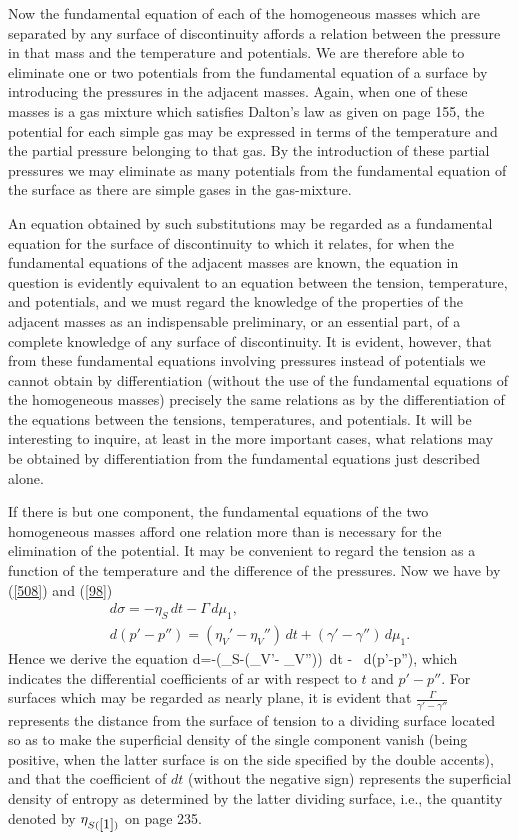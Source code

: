 \documentclass[12pt]{article}
\begin{document}
{Now the fundamental equation of each of the homogeneous masses which are separated by any surface of discontinuity affords a relation between the pressure in that mass and the temperature and potentials. We are therefore able to eliminate one or two potentials from the fundamental equation of a surface by introducing the pressures in the adjacent masses. Again, when one of these masses is a gas mixture which satisfies Dalton's law as given on page 155, the potential for each simple gas may be expressed in terms of the temperature and the partial pressure belonging to that gas. By the introduction of these partial pressures we may eliminate as many potentials from the fundamental equation of the surface as there are simple gases in the gas-mixture.

An equation obtained by such substitutions may be regarded as a fundamental equation for the surface of discontinuity to which it relates, for when the fundamental equations of the adjacent masses are known, the equation in question is evidently equivalent to an equation between the tension, temperature, and potentials, and we must regard the knowledge of the properties of the adjacent masses as an indispensable preliminary, or an essential part, of a complete knowledge of any surface of discontinuity. It is evident, however, that from these fundamental equations involving pressures instead of potentials we cannot obtain by differentiation (without the use of the fundamental equations of the homogeneous masses) precisely the same relations as by the differentiation of the equations between the tensions, temperatures, and potentials.  It will be interesting to inquire, at least in the more important cases, what relations may be obtained by differentiation from  the fundamental equations just described alone.

If there is but one component, the fundamental equations of the two homogeneous masses afford one relation more than is necessary for the elimination of the potential. It may be convenient to regard the tension as a function of the temperature and the difference of the pressures. Now we have by (\ref{508}) and (\ref{98})
\begin{gather*}d\sigma = - \eta_S \, dt- \Gamma\, d\mu_1, \\
d(p'-p'')= (\eta_V'- \eta_V'')\, dt +(\gamma'- \gamma'')\, d\mu_1. \end{gather*}
Hence we derive the equation
\eqs d\sigma =-\left(\eta_S-(\eta_V'- \eta_V'')\right) \,dt -  \, d(p'-p''), \label{578} \eqe
which indicates the differential coefficients of ar with respect to $t$ and $p' -p''$. For surfaces which may be regarded as nearly plane, it is
evident that $\frac{\Gamma}{\gamma'-\gamma''}$ represents the distance from the surface of tension to a dividing surface located so as to make the superficial density of the single component vanish (being positive, when the latter surface is on the side specified by the double accents), and that the coefficient of $dt$ (without the negative sign) represents the superficial density of entropy as determined by the latter dividing surface, i.e., the quantity denoted by $\eta_{S(\ref{1})}$ on page 235.

}
\end{document}
